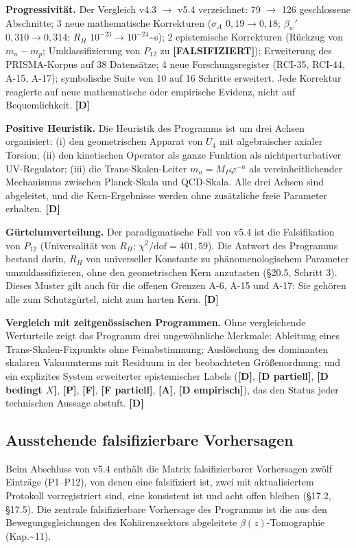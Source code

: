 ﻿\documentclass[11pt,letterpaper]{article}
\begin{document}
\textbf{Progressivität.} Der Vergleich v4.3 $\to$ v5.4 verzeichnet: 79 $\to$ 126 geschlossene Abschnitte; 3 neue mathematische Korrekturen ($\sigma_A$ $0{,}19 \to 0{,}18$; $\beta_w'$ $0{,}310 \to 0{,}314$; $R_H$ $10^{-23} \to 10^{-24}$\textasciitilde{}s); 2 epistemische Korrekturen (Rückzug von $m_n - m_p$; Umklassifizierung von $P_{12}$ zu \textbf{[FALSIFIZIERT]}); Erweiterung des PRISMA-Korpus auf 38 Datensätze; 4 neue Forschungsregister (RCI-35, RCI-44, A-15, A-17); symbolische Suite von 10 auf 16 Schritte erweitert. Jede Korrektur reagierte auf neue mathematische oder empirische Evidenz, nicht auf Bequemlichkeit. \textbf{[D]}

\textbf{Positive Heuristik.} Die Heuristik des Programms ist um drei Achsen organisiert: (i) den geometrischen Apparat von $U_4$ mit algebraischer axialer Torsion; (ii) den kinetischen Operator als ganze Funktion als nichtperturbativer UV-Regulator; (iii) die Trans-Skalen-Leiter $m_n = M_P \varphi^{-n}$ als vereinheitlichender Mechanismus zwischen Planck-Skala und QCD-Skala. Alle drei Achsen sind abgeleitet, und die Kern-Ergebnisse werden ohne zusätzliche freie Parameter erhalten. \textbf{[D]}

\textbf{Gürtelumverteilung.} Der paradigmatische Fall von v5.4 ist die Falsifikation von $P_{12}$ (Universalität von $R_H$; $\chi^2/\text{dof} = 401{,}59$). Die Antwort des Programms bestand darin, $R_H$ von universeller Konstante zu phänomenologischem Parameter umzuklassifizieren, ohne den geometrischen Kern anzutasten (§20.5, Schritt 3). Dieses Muster gilt auch für die offenen Grenzen A-6, A-15 und A-17: Sie gehören alle zum Schutzgürtel, nicht zum harten Kern. \textbf{[D]}

\textbf{Vergleich mit zeitgenössischen Programmen.} Ohne vergleichende Werturteile zeigt das Programm drei ungewöhnliche Merkmale: Ableitung eines Trans-Skalen-Fixpunkts ohne Feinabstimmung; Auslöschung des dominanten skalaren Vakuumterms mit Residuum in der beobachteten Größenordnung; und ein explizites System erweiterter epistemischer Labels (\textbf{[D]}, \textbf{[D partiell]}, \textbf{[D bedingt $X$]}, \textbf{[P]}, \textbf{[F]}, \textbf{[F partiell]}, \textbf{[A]}, \textbf{[D empirisch]}), das den Status jeder technischen Aussage abstuft. \textbf{[D]}
\subsection{Ausstehende falsifizierbare Vorhersagen}
Beim Abschluss von v5.4 enthält die Matrix falsifizierbarer Vorhersagen zwölf Einträge (P1--P12), von denen eine falsifiziert ist, zwei mit aktualisiertem Protokoll vorregistriert sind, eine konsistent ist und acht offen bleiben (§17.2, §17.5). Die zentrale falsifizierbare Vorhersage des Programms ist die aus den Bewegungsgleichungen des Kohärenzsektors abgeleitete $\beta(z)$-Tomographie (Kap.\textasciitilde{}11).
\end{document}
